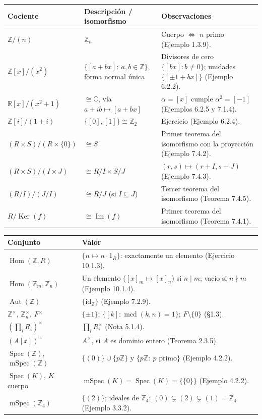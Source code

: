 \documentclass[11pt,twoside]{article}
\DeclareMathOperator{\Ker}{Ker}
\DeclareMathOperator{\Imm}{Im}
\DeclareMathOperator{\Aut}{Aut}
\DeclareMathOperator{\Hom}{Hom}
\DeclareMathOperator{\Spec}{Spec}
\DeclareMathOperator{\mSpec}{mSpec}
\DeclareMathOperator{\mcd}{mcd}
\newcommand{\Z}{\mathbb{Z}}
\newcommand{\R}{\mathbb{R}}
\newcommand{\C}{\mathbb{C}}
\begin{document}
\renewcommand{\arraystretch}{1.35}
\begin{longtable}{p{} p{} p{}}
\hline
\textbf{Cociente} & \textbf{Descripción / isomorfismo} & \textbf{Observaciones} \\
\hline
\endhead

$\Z/(n)$ & $\Z_{n}$ & Cuerpo $\iff$ $n$ primo (Ejemplo 1.3.9). \\
\hline
$\Z[x]/(x^{2})$ & $\{ [a + bx] :\ a, b \in \Z \}$, forma normal única & Divisores de cero $\{[bx] : b \neq 0\}$; unidades $\{[\pm 1 + bx]\}$ (Ejemplo 6.2.2). \\
\hline
$\R[x]/(x^{2}+1)$ & $\cong \C$, vía $a + ib \mapsto [a + bx]$ & $\alpha = [x]$ cumple $\alpha^{2} = [-1]$ (Ejemplos 6.2.5 y 7.1.4). \\
\hline
$\Z[i]/(1+i)$ & $\{[0], [1]\} \cong \Z_{2}$ & Ejercicio (Ejemplo 6.2.4). \\
\hline
$(R \times S)/(R \times \{0\})$ & $\cong S$ & Primer teorema del isomorfismo con la proyección (Ejemplo 7.4.2). \\
\hline
$(R \times S)/(I \times J)$ & $\cong R/I \times S/J$ & $(r,s) \mapsto (r+I, s+J)$ (Ejemplo 7.4.3). \\
\hline
$(R/I)/(J/I)$ & $\cong R/J$ (si $I \subseteq J$) & Tercer teorema del isomorfismo (Teorema 7.4.5). \\
\hline
$R/\Ker(f)$ & $\cong \Imm(f)$ & Primer teorema del isomorfismo (Teorema 7.4.1). \\
\hline
\end{longtable}

\begin{longtable}{p{} p{}}
\hline
\textbf{Conjunto} & \textbf{Valor} \\
\hline
\endhead

$\Hom(\Z, R)$ & $\{ n \mapsto n \cdot 1_{R} \}$: exactamente un elemento (Ejercicio 10.1.3). \\
\hline
$\Hom(\Z_{m}, \Z_{n})$ & Un elemento ($[x]_{m} \mapsto [x]_{n}$) si $n \mid m$; vacío si $n \nmid m$ (Ejemplo 10.1.4). \\
\hline
$\Aut(\Z)$ & $\{ \mathrm{id}_{\Z} \}$ (Ejemplo 7.2.9). \\
\hline
$\Z^{\times}$, $\Z_{n}^{\times}$, $F^{\times}$ & $\{\pm 1\}$; $\{[k] : \mcd(k,n) = 1\}$; $F \setminus \{0\}$ (§1.3). \\
\hline
$\left( \prod_{i} R_{i} \right)^{\times}$ & $\prod_{i} R_{i}^{\times}$ (Nota 5.1.4). \\
\hline
$(A[x])^{\times}$ & $A^{\times}$, si $A$ es dominio entero (Teorema 2.3.5). \\
\hline
$\Spec(\Z)$, $\mSpec(\Z)$ & $\{(0)\} \cup \{p\Z\}$ y $\{p\Z :\ p \text{ primo}\}$ (Ejemplo 4.2.2). \\
\hline
$\Spec(K)$, $K$ cuerpo & $\mSpec(K) = \Spec(K) = \{\{0\}\}$ (Ejemplo 4.2.2). \\
\hline
$\mSpec(\Z_{4})$ & $\{(2)\}$; ideales de $\Z_{4}$: $(0) \subsetneq (2) \subsetneq (1) = \Z_{4}$ (Ejemplo 3.3.2). \\
\hline
\end{longtable}
\renewcommand{\arraystretch}{1.0}
\end{document}
